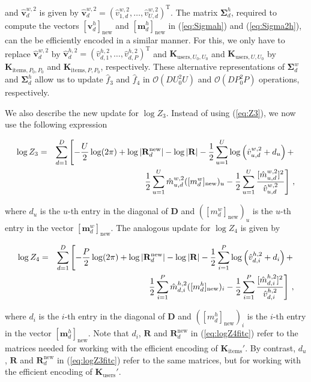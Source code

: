 \documentclass{article}
\begin{document}
and $\hat{\mathbf{v}}_d^{w,2}$ is given by
$\hat{\mathbf{v}}_d^{w,2}=(\hat{v}_{1,d}^{w,2},\ldots,\hat{v}_{U,d}^{w,2})^\text{T}$.
The matrix $\bm \Sigma_d^h $, required to compute the vectors $[\mathbf{v}_{d}^{h}]_\text{new}$ and $[\mathbf{m}_{d}^{h}]_\text{new}$
in (\ref{eq:Sigmah}) and (\ref{eq:Sigma2h}), can the be efficiently encoded in a similar manner.
For this, we only have to replace $\hat{\mathbf{v}}_d^{w,2}$
by $\hat{\mathbf{v}}_d^{h,2}=(\hat{v}_{d,1}^{h,2},\ldots,\hat{v}_{d,P}^{h,2})^\text{T}$ and
$\mathbf{K}_{\text{users},U_0,U_0}$ and $\mathbf{K}_{\text{users},U,U_0}$ by
$\mathbf{K}_{\text{items},P_0,P_0}$ and $\mathbf{K}_{\text{items},P,P_0}$, respectively.
These alternative representations of $\bm \Sigma_d^w$ and $\bm \Sigma_d^h$ allow us to
update $\hat{f}_3$ and $\hat{f}_4$ in $\mathcal{O}(DU_0^2U)$ and $\mathcal{O}(DP_0^2P)$ operations, respectively.

We also describe the new update for $\log Z_3$. Instead of using (\ref{eq:Z3}), we now use the following expression

\begin{eqnarray}
\log Z_3 & = & \sum_{d=1}^D \left[ -\frac{U}{2} \log(2 \pi) +
\log|\mathbf{R}^\text{new}_d| - \log|\mathbf{R}| - 
\frac{1}{2} \sum_{u=1}^U \log \left(\hat{v}_{u,d}^{w,2} + d_u \right) + \right. \notag\\
& & \left. \frac{1}{2} \sum_{u=1}^U \hat{m}_{u,d}^{w,2} ([m_{d}^{w}]_\text{new})_u -
\frac{1}{2} \sum_{u=1}^U \frac{[\hat{m}_{u,d}^{w,2}]^2}{\hat{v}_{u,d}^{w,2}}\right]\,,\label{eq:logZ3fitc}
\end{eqnarray}

where $d_u$ is the $u$-th entry in the diagonal of $\mathbf{D}$ and $([m_{d}^{w}]_\text{new})_u$
is the $u$-th entry in the vector $[\mathbf{m}_{d}^{w}]_\text{new}$.
The analogous update for $\log Z_4$ is given by

\begin{eqnarray}
\log Z_4 & = & \sum_{d=1}^D \left[ -\frac{P}{2} \log(2 \pi) +
\log|\mathbf{R}^\text{new}_d| - \log|\mathbf{R}| - 
\frac{1}{2} \sum_{i=1}^P \log \left(\hat{v}_{d,i}^{h,2} + d_i\right) + \right. \notag\\
& & \left. \frac{1}{2} \sum_{i=1}^P \hat{m}_{d,i}^{h,2} ([m_{d}^{h}]_\text{new})_i -
\frac{1}{2} \sum_{i=1}^P \frac{[\hat{m}_{d,i}^{h,2}]^2}{\hat{v}_{d,i}^{h,2}}\right]\,,\label{eq:logZ4fitc}
\end{eqnarray}

where $d_i$ is the $i$-th entry in the diagonal of $\mathbf{D}$ and $([m_{d}^{h}]_\text{new})_i$
is the $i$-th entry in the vector $[\mathbf{m}_{d}^{h}]_\text{new}$.
Note that $d_i$, $\mathbf{R}$ and $\mathbf{R}^\text{new}_d$ in (\ref{eq:logZ4fitc}) refer to the matrices needed
for working with the efficient encoding of
$\mathbf{K}_\text{items}'$. By contrast, $d_u$, $\mathbf{R}$ and $\mathbf{R}^\text{new}_d$ in (\ref{eq:logZ3fitc}) 
refer to the same matrices, but for working with the efficient encoding of $\mathbf{K}_\text{users}'$.
\end{document}
